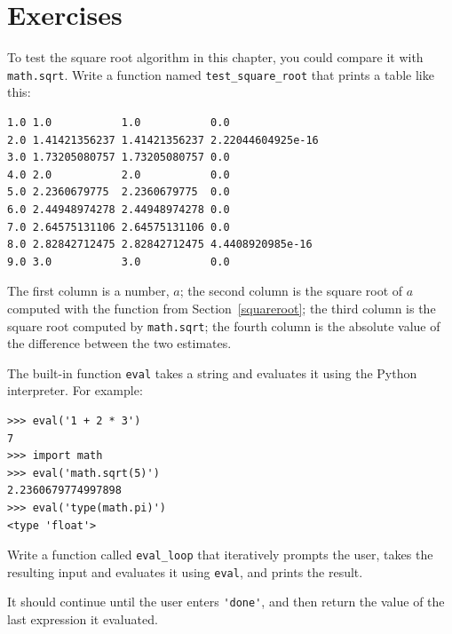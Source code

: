 \documentclass[10pt]{book}
\begin{document}
\section{Exercises}

\begin{exercise}

To test the square root algorithm in this chapter, you could compare
it with {\tt math.sqrt}.  Write a function named \verb"test_square_root"
that prints a table like this:

\begin{verbatim}
1.0 1.0           1.0           0.0
2.0 1.41421356237 1.41421356237 2.22044604925e-16
3.0 1.73205080757 1.73205080757 0.0
4.0 2.0           2.0           0.0
5.0 2.2360679775  2.2360679775  0.0
6.0 2.44948974278 2.44948974278 0.0
7.0 2.64575131106 2.64575131106 0.0
8.0 2.82842712475 2.82842712475 4.4408920985e-16
9.0 3.0           3.0           0.0

\end{verbatim}
%
The first column is a number, $a$; the second column is
the square root of $a$ computed with the function from
Section~\ref{squareroot}; the third column is the square root computed
by {\tt math.sqrt}; the fourth column is the absolute value
of the difference between the two estimates.
\end{exercise}


\begin{exercise}

The built-in function {\tt eval} takes a string and evaluates
it using the Python interpreter.  For example:

\begin{verbatim}
>>> eval('1 + 2 * 3')
7
>>> import math
>>> eval('math.sqrt(5)')
2.2360679774997898
>>> eval('type(math.pi)')
<type 'float'>
\end{verbatim}
%
Write a function called \verb"eval_loop" that iteratively
prompts the user, takes the resulting input and evaluates
it using {\tt eval}, and prints the result.

It should continue until the user enters \verb"'done'", and then
return the value of the last expression it evaluated.

\end{exercise}
\end{document}
